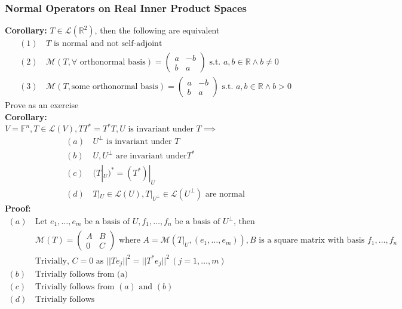 \documentclass{article}
\newcommand{\R}{\mathbb{R}}
\newcommand{\F}{\mathbb{F}}
\newcommand{\st}{\mbox{ s.t. }}
\newcommand{\0}{{\bf{0}}}
\begin{document}
\subsubsection{Normal Operators on Real Inner Product Spaces}
\textbf{Corollary: }$T\in\mathcal{L}(\R^2)$, then the following are equivalent
\begin{equation}
\begin{split}
    (1)\,&T\mbox{ is normal and not self-adjoint}\\
    (2)\,&\mathcal{M}(T,\forall\mbox{ orthonormal basis})=\begin{pmatrix}
        a&-b\\
        b&a
    \end{pmatrix}\st a,b\in\R\land b\neq0\\
    (3)\,&\mathcal{M}(T,\mbox{some orthonormal basis})=\begin{pmatrix}
        a&-b\\
        b&a
    \end{pmatrix}\st a,b\in\R\land b>0
\end{split}
\end{equation}
\null\hfill{Prove as an exercise}\\
\textbf{Corollary:}\\
$V=\F^n,T\in\mathcal{L}(V),TT^*=T^*T,U\mbox{ is invariant under }T\implies$
\begin{equation}
\begin{split}
    (a)\,&U^\perp\mbox{ is invariant under }T\\
    (b)\,&U,U^\perp\mbox{ are invariant under}T^*\\
    (c)\,&(T|_U)^*=(T^*)|_U\\
    (d)\,&T|_U\in\mathcal{L}(U),T|_{U^\perp}\in\mathcal{L}(U^\perp)\mbox{ are normal}
\end{split}
\end{equation}
\textbf{Proof:}
\begin{equation}
\begin{split}
    (a)\,&\mbox{Let }e_1,\dots,e_m\mbox{ be a basis of }U,f_1,\dots,f_n\mbox{ be a basis of }U^\perp\mbox{, then}\\
    &\mathcal{M}(T)=\begin{pmatrix}
        A&B\\
        0&C
    \end{pmatrix}\mbox{ where }A=\mathcal{M}(T|_U,(e_1,\dots,e_m)),B\mbox{ is a square matrix with basis }f_1,\dots,f_n\\
    &\mbox{Trivially, }C=0\mbox{ as }||Te_j||^2=||T^*e_j||^2\,(j=1,\dots,m)\\
    (b)\,&\mbox{Trivially follows from (a)}\\
    (c)\,&\mbox{Trivially follows from }(a)\mbox{ and }(b)\\
    (d)\,&\mbox{Trivially follows}
\end{split}
\end{equation}
\end{document}
